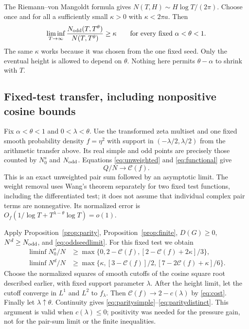 ﻿\documentclass[11pt]{article}
\theoremstyle{remark}
\newcommand{\cC}{\mathcal C}
\begin{document}
The Riemann--von Mangoldt formula gives
$N(T,H)\sim H\log T/(2\pi)$. Choose once and for all a sufficiently
small $\kappa>0$ with $\kappa<2\pi a$. Then
\begin{equation}\label{eq:oddseedlimit}
 \liminf_{T\to\infty}\frac{N_{\rm odd}(T,T^\theta)}{N(T,T^\theta)}
 \ge\kappa
 \qquad\hbox{for every fixed }\alpha<\theta<1.
\end{equation}
The same $\kappa$ works because it was chosen from the one fixed seed.
Only the eventual height is allowed to depend on $\theta$. Nothing here
permits $\theta-\alpha$ to shrink with $T$.

\subsection{Fixed-test transfer, including nonpositive cosine bounds}

Fix $\alpha<\theta<1$ and $0<\lambda<\theta$. Use the transformed
zeta multiset and one fixed smooth probability density $f=\eta^2$ with
support in $(-\lambda/2,\lambda/2)$ from the arithmetic transfer above.
Its real simple and odd points are precisely those counted by $N_0^s$
and $N_{\rm odd}$. Equations \eqref{eq:unweighted} and
\eqref{eq:functional} give
\[
 Q/N\longrightarrow\cC(f).
\]
This is an exact unweighted pair sum followed by an asymptotic limit.
The weight removal uses Wang's theorem separately for two fixed test
functions, including the differentiated test; it does not assume that
individual complex pair terms are nonnegative. Its normalized error is
$O_f(1/\log T+T^{\lambda-\theta}\log T)=o(1)$.

Apply Proposition~\ref{prop:parity}, Proposition~\ref{prop:finite},
$D(G)\ge0$, $N^d\ge N_{\rm odd}$, and \eqref{eq:oddseedlimit}.
For this fixed test we obtain
\begin{align*}
\liminf N_0^s/N&\ge\max\{0,2-\cC(f),[2-\cC(f)+2\kappa]/3\},\\
\liminf N^d/N&\ge\max\{\kappa,[3-\cC(f)]/2,
                            [7-2\cC(f)+\kappa]/6\}.
\end{align*}
Choose the normalized squares of smooth cutoffs of the cosine square
root described earlier, with fixed support parameter $\lambda$.
After the height limit, let the cutoff converge in $L^1$ and $L^2$ to
$f_\lambda$. Then $\cC(f)\to2-c(\lambda)$ by \eqref{eq:cost}.
Finally let $\lambda\uparrow\theta$. Continuity gives
\eqref{eq:paritysimple}--\eqref{eq:paritydistinct}. This argument is
valid when $c(\lambda)\le0$; positivity was needed for the pressure gain,
not for the pair-sum limit or the finite inequalities.
\end{document}
